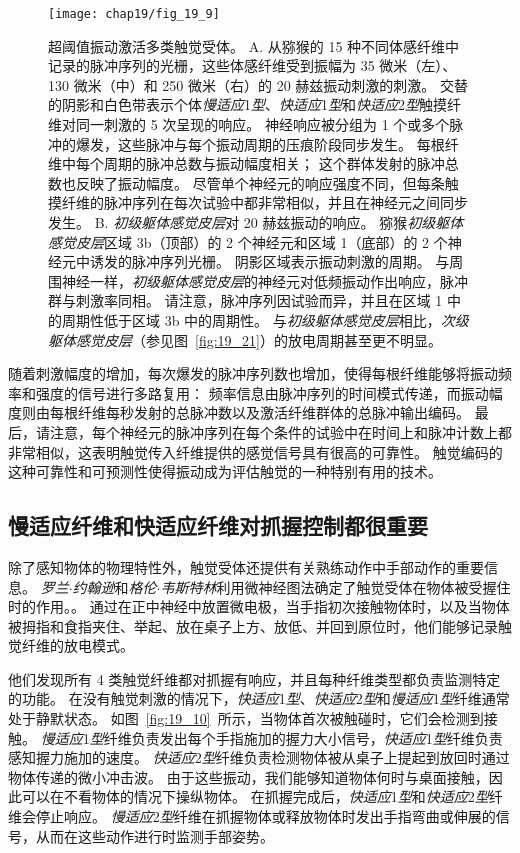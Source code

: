 \begin{figure}[htbp]
	\centering
	\texttt{[image: chap19/fig\_19\_9]}
	\caption{超阈值振动激活多类触觉受体。
		A. 从猕猴的 15 种不同体感纤维中记录的脉冲序列的光栅，这些体感纤维受到振幅为 35 微米（左）、130 微米（中）和 250 微米（右）的 20 赫兹振动刺激的刺激。
		交替的阴影和白色带表示个体\textit{慢适应}1\textit{型}、\textit{快适应}1\textit{型}和\textit{快适应}2\textit{型}触摸纤维对同一刺激的 5 次呈现的响应。
		神经响应被分组为 1 个或多个脉冲的爆发，这些脉冲与每个振动周期的压痕阶段同步发生。
		每根纤维中每个周期的脉冲总数与振动幅度相关；
		这个群体发射的脉冲总数也反映了振动幅度。
		尽管单个神经元的响应强度不同，但每条触摸纤维的脉冲序列在每次试验中都非常相似，并且在神经元之间同步发生\cite{muniak2007neural}。
		B. \textit{初级躯体感觉皮层}对 20 赫兹振动的响应。
		猕猴\textit{初级躯体感觉皮层}区域 3b（顶部）的 2 个神经元和区域 1（底部）的 2 个神经元中诱发的脉冲序列光栅。
		阴影区域表示振动刺激的周期。
		与周围神经一样，\textit{初级躯体感觉皮层}的神经元对低频振动作出响应，脉冲群与刺激率同相。
		请注意，脉冲序列因试验而异，并且在区域 1 中的周期性低于区域 3b 中的周期性。
		与\textit{初级躯体感觉皮层}相比，\textit{次级躯体感觉皮层}（参见图~\ref{fig:19_21}）的放电周期甚至更不明显\cite{salinas2000periodicity}。}
	\label{fig:19_9}
\end{figure}


随着刺激幅度的增加，每次爆发的脉冲序列数也增加，使得每根纤维能够将振动频率和强度的信号进行多路复用：
频率信息由脉冲序列的时间模式传递，而振动幅度则由每根纤维每秒发射的总脉冲数以及激活纤维群体的总脉冲输出编码。
最后，请注意，每个神经元的脉冲序列在每个条件的试验中在时间上和脉冲计数上都非常相似，这表明触觉传入纤维提供的感觉信号具有很高的可靠性。 
触觉编码的这种可靠性和可预测性使得振动成为评估触觉的一种特别有用的技术。



\subsection{慢适应纤维和快适应纤维对抓握控制都很重要}

除了感知物体的物理特性外，触觉受体还提供有关熟练动作中手部动作的重要信息。
\textit{罗兰$\cdot$约翰逊}和\textit{格伦$\cdot$韦斯特林}利用微神经图法确定了触觉受体在物体被受握住时的作用。。
通过在正中神经中放置微电极，当手指初次接触物体时，以及当物体被拇指和食指夹住、举起、放在桌子上方、放低、并回到原位时，他们能够记录触觉纤维的放电模式。


他们发现所有 4 类触觉纤维都对抓握有响应，并且每种纤维类型都负责监测特定的功能。
在没有触觉刺激的情况下，\textit{快适应}1\textit{型}、\textit{快适应}2\textit{型}和\textit{慢适应}1\textit{型}纤维通常处于静默状态。
如图~\ref{fig:19_10}~所示，当物体首次被触碰时，它们会检测到接触。
\textit{慢适应}1\textit{型}纤维负责发出每个手指施加的握力大小信号，\textit{快适应}1\textit{型}纤维负责感知握力施加的速度。
\textit{快适应}2\textit{型}纤维负责检测物体被从桌子上提起到放回时通过物体传递的微小冲击波。
由于这些振动，我们能够知道物体何时与桌面接触，因此可以在不看物体的情况下操纵物体。
在抓握完成后，\textit{快适应}1\textit{型}和\textit{快适应}2\textit{型}纤维会停止响应。
\textit{慢适应}2\textit{型}纤维在抓握物体或释放物体时发出手指弯曲或伸展的信号，从而在这些动作进行时监测手部姿势。


